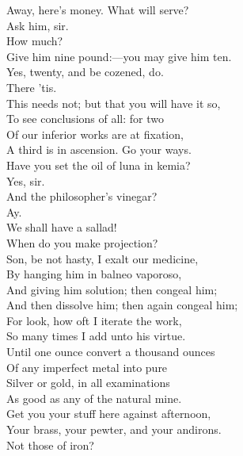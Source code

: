 \documentclass[a4paper,oneside,12pt]{memoir}
\begin{document}
\begin{drama*}
\mammonspeaks Away, here's money. What will serve?\\
\facespeaks {} Ask him, sir.\\
\mammonspeaks How much?\\
\subtlespeaks {} Give him nine pound:---you may give him ten.\\
\surlyspeaks Yes, twenty, and be cozened, do.\\
\mammonspeaks {} There 'tis.\\
\subtlespeaks This needs not; but that you will have it so,\\
To see conclusions of all: for two\\
Of our inferior works are at fixation,\\
A third is in ascension. Go your ways.\\
Have you set the oil of luna in kemia?\\
\facespeaks Yes, sir.\\
\subtlespeaks {} And the philosopher's vinegar?\\
\facespeaks {} Ay.\\
\surlyspeaks We shall have a sallad!\\
\mammonspeaks {} When do you make projection?\\
\subtlespeaks Son, be not hasty, I exalt our medicine,\\
By hanging him in balneo vaporoso,\\
And giving him solution; then congeal him;\\
And then dissolve him; then again congeal him;\\
For look, how oft I iterate the work,\\
So many times I add unto his virtue.\\
Until one ounce convert a thousand ounces\\
Of any imperfect metal into pure\\
Silver or gold, in all examinations\\
As good as any of the natural mine.\\
Get you your stuff here against afternoon,\\
Your brass, your pewter, and your andirons.\\
\mammonspeaks Not those of iron?\\

\end{drama*}
\end{document}
